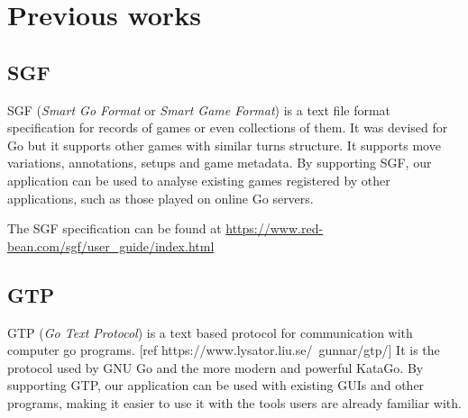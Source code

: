 \section{Previous works}

\subsection{SGF}

SGF (\textit{Smart Go Format} or \textit{Smart Game Format}) is a text file
format specification for records of games or even collections of them. It was
devised for Go but it supports other games with similar turns structure. It
supports move variations, annotations, setups and game metadata. By supporting
SGF, our application can be used to analyse existing games registered by other
applications, such as those played on online Go servers.

The SGF specification can be found at
\url{https://www.red-bean.com/sgf/user_guide/index.html}

\subsection{GTP}

GTP (\textit{Go Text Protocol}) is a text based protocol for communication with
computer go programs. [ref https://www.lysator.liu.se/~gunnar/gtp/] It is the
protocol used by GNU Go and the more modern and powerful KataGo. By supporting
GTP, our application can be used with existing GUIs and other programs, making
it easier to use it with the tools users are already familiar with.
